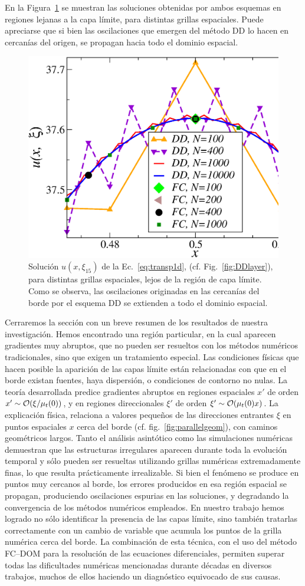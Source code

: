 En la Figura~\ref{fig:DDlayer2} se muestran las soluciones obtenidas por ambos esquemas 
en regiones lejanas a la capa límite, para distintas grillas espaciales. 
Puede apreciarse que si bien las oscilaciones que emergen del método DD lo hacen 
en cercanías del origen, 
se propagan hacia todo el dominio espacial.
\begin{figure}[h!]
\centering
  \includegraphics[width=0.5\linewidth]{figuras/conv_2.eps}
  \caption{Solución $u(x,\xi_{15})$ de la Ec.~\eqref{eq:transp1d}, 
  (cf. Fig.~\ref{fig:DDlayer}), para distintas grillas espaciales, 
  lejos de la región de capa límite. 
  Como se observa, las oscilaciones originadas en 
  las cercanías del borde por el esquema DD se extienden a todo el dominio espacial.}
 \label{fig:DDlayer2}
\end{figure}

Cerraremos la sección con un breve resumen de los resultados de
nuestra investigación.
Hemos encontrado una región particular, en la cual aparecen gradientes
muy abruptos, que no pueden ser resueltos con los métodos numéricos
tradicionales, sino que exigen un tratamiento especial.
Las condiciones físicas que hacen posible la aparición de las capas
límite están relacionadas con que en el borde existan fuentes, haya
dispersión, o condiciones de contorno no nulas.
La teoría desarrollada predice gradientes abruptos en regiones
espaciales $x'$ de orden $x'\sim \mathcal{O}(\xi/\mu_t(0))$, y en regiones
direccionales $\xi'$ de orden $\xi'\sim \mathcal{O}(\mu_t(0) x)$.
La explicación física, relaciona a valores pequeños de las direcciones
entrantes $\xi$ en puntos espaciales $x$ cerca del borde
(cf. fig.~\ref{fig:parallelgeom}), con caminos geométricos largos.
Tanto el análisis asintótico como las simulaciones numéricas demuestran
que las estructuras irregulares aparecen durante toda la evolución temporal
y sólo pueden ser resueltas utilizando grillas numéricas extremadamente
finas, lo que resulta prácticamente irrealizable.
Si bien el fenómeno se produce en puntos muy cercanos al
borde, los errores producidos en esa región espacial se propagan,
produciendo oscilaciones espurias en las soluciones, y degradando la
convergencia de los métodos numéricos empleados.
En nuestro trabajo hemos logrado no sólo identificar la presencia
de las capas límite, sino también tratarlas correctamente con un
cambio de variable que acumula los puntos de la grilla numérica cerca
del borde. La combinación de esta técnica, con el uso del método FC--DOM
para la resolución de las ecuaciones diferenciales, permiten superar
todas las dificultades numéricas mencionadas durante décadas en
diversos trabajos, muchos de ellos haciendo un diagnóstico equivocado
de sus causas.

\pagestyle{empty}


